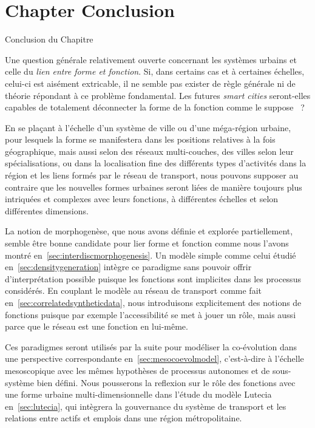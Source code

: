 




\newpage


\section*{Chapter Conclusion}{Conclusion du Chapitre}



Une question générale relativement ouverte concernant les systèmes urbains et celle du \emph{lien entre forme et fonction}. Si, dans certains cas et à certaines échelles, celui-ci est aisément extricable, il ne semble pas exister de règle générale ni de théorie répondant à ce problème fondamental. Les futures \emph{smart cities} seront-elles capables de totalement déconnecter la forme de la fonction comme le suppose~\cite{batty2017age} ?

En se plaçant à l'échelle d'un système de ville ou d'une méga-région urbaine, pour lesquels la forme se manifestera dans les positions relatives à la fois géographique, mais aussi selon des réseaux multi-couches, des villes selon leur spécialisations, ou dans la localisation fine des différents types d'activités dans la région et les liens formés par le réseau de transport, nous pouvons supposer au contraire que les nouvelles formes urbaines seront liées de manière toujours plus intriquées et complexes avec leurs fonctions, à différentes échelles et selon différentes dimensions.

La notion de morphogenèse, que nous avons définie et explorée partiellement, semble être bonne candidate pour lier forme et fonction comme nous l'avons montré en~\ref{sec:interdiscmorphogenesis}. Un modèle simple comme celui étudié en~\ref{sec:densitygeneration} intègre ce paradigme sans pouvoir offrir d'interprétation possible puisque les fonctions sont implicites dans les processus considérés. En couplant le modèle au réseau de transport comme fait en~\ref{sec:correlatedsyntheticdata}, nous introduisons explicitement des notions de fonctions puisque par exemple l'accessibilité se met à jouer un rôle, mais aussi parce que le réseau est une fonction en lui-même.

Ces paradigmes seront utilisés par la suite pour modéliser la co-évolution dans une perspective correspondante en~\ref{sec:mesocoevolmodel}, c'est-à-dire à l'échelle mesoscopique avec les mêmes hypothèses de processus autonomes et de sous-système bien défini. Nous pousserons la reflexion sur le rôle des fonctions avec une forme urbaine multi-dimensionnelle dans l'étude du modèle Lutecia en~\ref{sec:lutecia}, qui intègrera la gouvernance du système de transport et les relations entre actifs et emplois dans une région métropolitaine.




\stars



